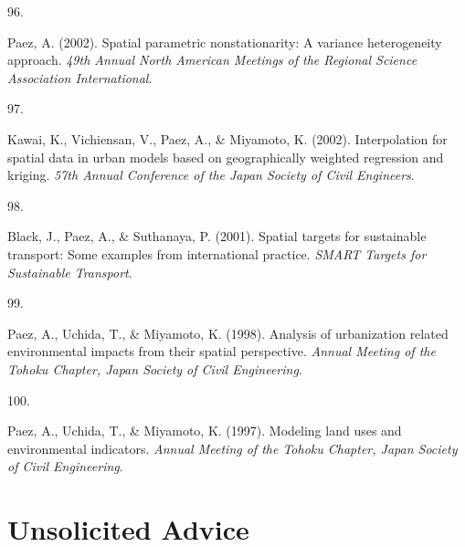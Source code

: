 \documentclass[10pt,a4paper,]{twentysecondcv}
\newlength{\csllabelwidth}
\newcommand{\CSLLeftMargin}[1]{\parbox[t]{\csllabelwidth}{#1}}
\newcommand{\CSLRightInline}[1]{\parbox[t]{\linewidth - \csllabelwidth}{#1}}
\begin{document}
\leavevmode{}%
\CSLLeftMargin{96. }%
\CSLRightInline{Paez, A. (2002). Spatial parametric nonstationarity: A
variance heterogeneity approach. \emph{49th Annual North American
Meetings of the Regional Science Association International}.}

\leavevmode{}%
\CSLLeftMargin{97. }%
\CSLRightInline{Kawai, K., Vichiensan, V., Paez, A., \& Miyamoto, K.
(2002). Interpolation for spatial data in urban models based on
geographically weighted regression and kriging. \emph{57th Annual
Conference of the Japan Society of Civil Engineers}.}

\leavevmode{}%
\CSLLeftMargin{98. }%
\CSLRightInline{Black, J., Paez, A., \& Suthanaya, P. (2001). Spatial
targets for sustainable transport: Some examples from international
practice. \emph{SMART Targets for Sustainable Transport}.}

\leavevmode{}%
\CSLLeftMargin{99. }%
\CSLRightInline{Paez, A., Uchida, T., \& Miyamoto, K. (1998). Analysis
of urbanization related environmental impacts from their spatial
perspective. \emph{Annual Meeting of the Tohoku Chapter, Japan Society
of Civil Engineering}.}

\leavevmode{}%
\CSLLeftMargin{100. }%
\CSLRightInline{Paez, A., Uchida, T., \& Miyamoto, K. (1997). Modeling
land uses and environmental indicators. \emph{Annual Meeting of the
Tohoku Chapter, Japan Society of Civil Engineering}.}

\hypertarget{unsolicited-advice}{%
\section{Unsolicited Advice}\label{unsolicited-advice}}

\nopagebreak

\begin{twenty}
\end{twenty}
\end{document}
